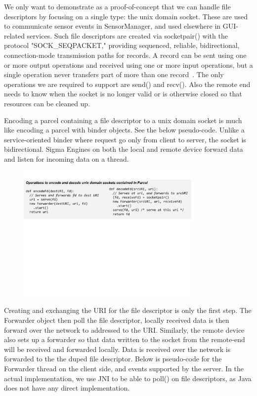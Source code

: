 \documentclass[prodmode]{acmlarge}
\begin{document}
We only want to demonstrate as a proof-of-concept that we can handle file descriptors by focusing on a single type: the unix domain socket. These are used to communicate sensor events in SensorManager, and used elsewhere in GUI-related services. Such file descriptors are created via socketpair() with the protocol "SOCK\_SEQPACKET," providing sequenced, reliable, bidirectional, connection-mode transmission paths for records. A record can be sent using one or more output operations and received using one or more input operations, but a single operation never transfers part of more than one record~\cite{SocketManPage}. The only operations we are required to support are send() and recv(). Also the remote end needs to know when the socket is no longer valid or is otherwise closed so that resources can be cleaned up.

Encoding a parcel containing a file descriptor to a unix domain socket is much like encoding a parcel with binder objects. See the below pseudo-code. Unlike a service-oriented binder where request go only from client to server, the socket is bidirectional. Sigma Engines on both the local and remote device forward data and listen for incoming data on a thread.

\begin{figure}
\centering
\includegraphics[width=0.8\textwidth]{drawings/encodeFds.pdf}
\end{figure}

Creating and exchanging the URI for the file descriptor is only the first step. The Forwarder object then poll the file descriptor, locally received data is then forward over the network to addressed to the URI. Similarly, the remote device also sets up a forwarder so that data written to the socket from the remote-end will be received and forwarded locally. Data is received over the network is forwarded to the the duped file descriptor. Below is pseudo-code for the Forwarder thread on the client side, and events supported by the server. In the actual implementation, we use JNI to be able to poll() on file descriptors, as Java does not have any direct implementation.
\end{document}
